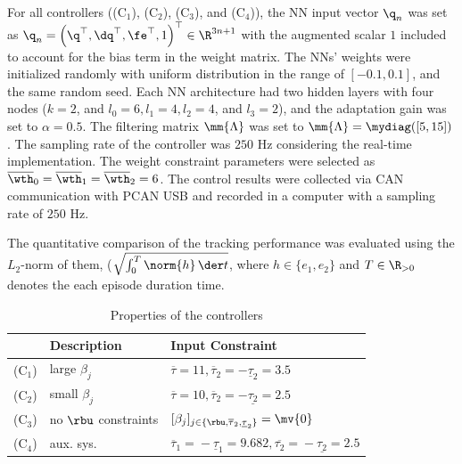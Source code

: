\documentclass[lettersize,journal]{IEEEtran}
\begin{document}
\hfill

For all controllers ((C$_1$), (C$_2$), (C$_3$), and (C$_4$)), the NN input vector ${\q}_n$ was set as ${\q}_n=\left(\q^\top,\dq^\top,\fe^\top,1\right)^\top\in\R^{3n+1}$ with the augmented scalar $1$ included to account for the bias term in the weight matrix. 
The NNs' weights were initialized randomly with uniform distribution in the range of $[-0.1,0.1]$, and the same random seed.
Each NN architecture had two hidden layers with four nodes (\ie $k=2$, and $l_0=6, l_1=4, l_2=4$, and $l_3=2$), and the adaptation gain was set to $\alpha=0.5$.
The filtering matrix $\mm{\Lambda}$ was set to $\mm{\Lambda}=\mydiag([5,15])$.
The sampling rate of the controller was $250$ Hz considering the real-time implementation.
The weight constraint parameters were selected as $\overline\wth_0=\overline\wth_1=\overline\wth_2=6$.
The control results were collected via CAN communication with PCAN USB  and recorded in a computer with a sampling rate of $250$ Hz.

The quantitative comparison of the tracking performance was evaluated using the $L_2$-norm of them, (\ie $\sqrt{\int_0^T\norm{h}\,\der t}$, where $h\in\{e_1,e_2\}$ and $T\in\R_{>0}$ denotes the each episode duration time.

\begin{table}[t]
    \renewcommand{\arraystretch}{1.3}
    \caption{Properties of the controllers}
    \label{table:controller}
    \centering
    \begin{tabular}{c l l}
    \hline
        \!&\!\bf{Description}\!&\!\bf{Input Constraint}\!\\
    \hline
    \hline
        (C$_1$)\!&\!large $\beta_j$\!&\!$\overline{\tau}=11,\overline{\tau}_2=-\underline{\tau}_2=3.5$ \\
    \hline
        (C$_2$)\!&\!small $\beta_j$\!&\!$\overline{\tau}=10,\overline{\tau}_2=-\underline{\tau_2}=2.5$ \\
    \hline
        (C$_3$)\!&\!no $\rbu$ constraints\!&\!$[\beta_j]_{j\in\{\rbu,\overline{\tau}_2,\underline{\tau}_2\}}=\mv{0}$ \\
    \hline
        (C$_4$)\!&\!aux. sys.\!&\!$\overline{\tau}_1\!=\!-\underline{\tau}_1\!=\!9.682,\overline{\tau_2}\!=\!-\underline{\tau_2}\!=\!2.5$\!\\
    \hline
    \end{tabular}
    \label{table:controllers}
\end{table}
\end{document}
